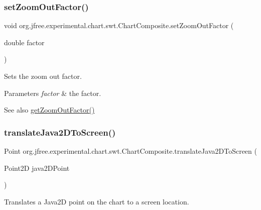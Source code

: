 \subsubsection{\texorpdfstring{set\+Zoom\+Out\+Factor()}{setZoomOutFactor()}}
{\footnotesize\ttfamily void org.\+jfree.\+experimental.\+chart.\+swt.\+Chart\+Composite.\+set\+Zoom\+Out\+Factor (\begin{DoxyParamCaption}\item[{double}]{factor }\end{DoxyParamCaption})}

Sets the zoom out factor.


\begin{DoxyParams}{Parameters}
{\em factor} & the factor.\\
\hline
\end{DoxyParams}
\begin{DoxySeeAlso}{See also}
\mbox{\hyperlink{classorg_1_1jfree_1_1experimental_1_1chart_1_1swt_1_1_chart_composite_acfca8f3fd361b336c10d53ace3bc6251}{get\+Zoom\+Out\+Factor()}} 
\end{DoxySeeAlso}
\mbox{\label{classorg_1_1jfree_1_1experimental_1_1chart_1_1swt_1_1_chart_composite_a4558c784478634685144fb83a21b2349}} 
\subsubsection{\texorpdfstring{translate\+Java2\+D\+To\+Screen()}{translateJava2DToScreen()}}
{\footnotesize\ttfamily Point org.\+jfree.\+experimental.\+chart.\+swt.\+Chart\+Composite.\+translate\+Java2\+D\+To\+Screen (\begin{DoxyParamCaption}\item[{Point2D}]{java2\+D\+Point }\end{DoxyParamCaption})}

Translates a Java2D point on the chart to a screen location.



